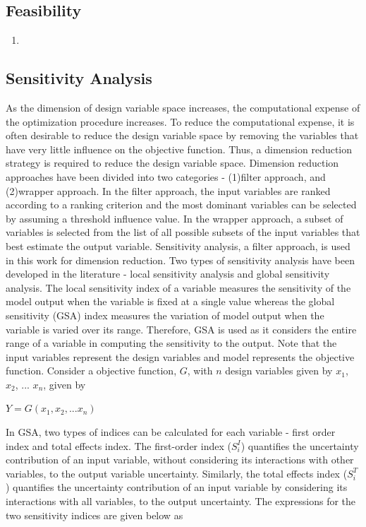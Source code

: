 \documentclass[11pt]{article}
\begin{document}
\subsection{Feasibility}
	\begin{enumerate}
		\item 
	\end{enumerate}

\subsection{Sensitivity Analysis}
\hspace{5 mm} As the dimension of design variable space increases, the computational expense of the optimization procedure increases. To reduce the computational expense, it is often desirable to reduce the design variable space by removing the variables that have very little influence on the objective function. Thus, a dimension reduction strategy is required to reduce the design variable space. Dimension reduction approaches have been divided into two categories - (1)filter approach, and (2)wrapper approach. In the filter approach, the input variables are ranked according to a ranking criterion and the most dominant variables can be selected by assuming a threshold influence value. In the wrapper approach, a subset of variables is selected from the list of all possible subsets of the input variables that best estimate the output variable. Sensitivity analysis, a filter approach, is used in this work for dimension reduction. Two types of sensitivity analysis have been developed in the literature - local sensitivity analysis and global sensitivity analysis. The local sensitivity index of a variable measures the sensitivity of the model output when the variable is fixed at a single value whereas the global sensitivity (GSA) index measures the variation of model output when the variable is varied over its range. Therefore, GSA is used as it considers the entire range of a variable in computing the sensitivity to the output. Note that the input variables represent the design variables and model represents the objective function.
Consider a objective function, $G$, with $n$ design variables given by $x_{1}$, $x_{2}$, ...  $x_{n}$, given by

\centerline{$Y = G(x_{1}, x_{2}, ... x_{n})$}

In GSA, two types of indices can be calculated for each variable - first order index and total effects index. The first-order index ($S_{i}^{I}$) quantifies the uncertainty contribution of an input variable, without considering its interactions with other variables, to the output variable uncertainty. Similarly, the total effects index ($S_{i}^{T}$) quantifies the uncertainty contribution of an input variable by considering its interactions with all variables, to the output uncertainty. The expressions for the two sensitivity indices are given below as 
\end{document}
